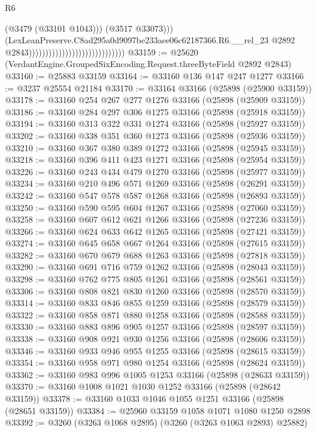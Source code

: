 \begin{lexlean}{R6}
\begin{coremodule}
                                                                  (@3479 (@33101 @1043)))
                                                                (@3517 @33073)))
                                                            (LexLeanPreserve.C8ad295a0d9097be233aee06c62187366.R6.__rel_23
                                                              @2892
                                                              @2843)))))))))))))))))))))))))))))
@33159 := @25620 (VerdantEngine.GroupedSixEncoding.Request.threeByteField @2892 @2843)
@33160 := @25883 @33159
@33164 := @33160 @136 @147 @247 @1277
@33166 := @3237 @25554 @21184
@33170 := @33164 @33166 (@25898 (@25900 @33159))
@33178 := @33160 @254 @267 @277 @1276 @33166 (@25898 (@25909 @33159))
@33186 := @33160 @284 @297 @306 @1275 @33166 (@25898 (@25918 @33159))
@33194 := @33160 @313 @322 @331 @1274 @33166 (@25898 (@25927 @33159))
@33202 := @33160 @338 @351 @360 @1273 @33166 (@25898 (@25936 @33159))
@33210 := @33160 @367 @380 @389 @1272 @33166 (@25898 (@25945 @33159))
@33218 := @33160 @396 @411 @423 @1271 @33166 (@25898 (@25954 @33159))
@33226 := @33160 @243 @434 @479 @1270 @33166 (@25898 (@25977 @33159))
@33234 := @33160 @210 @496 @571 @1269 @33166 (@25898 (@26291 @33159))
@33242 := @33160 @547 @578 @587 @1268 @33166 (@25898 (@26893 @33159))
@33250 := @33160 @590 @595 @604 @1267 @33166 (@25898 (@27060 @33159))
@33258 := @33160 @607 @612 @621 @1266 @33166 (@25898 (@27236 @33159))
@33266 := @33160 @624 @633 @642 @1265 @33166 (@25898 (@27421 @33159))
@33274 := @33160 @645 @658 @667 @1264 @33166 (@25898 (@27615 @33159))
@33282 := @33160 @670 @679 @688 @1263 @33166 (@25898 (@27818 @33159))
@33290 := @33160 @691 @716 @759 @1262 @33166 (@25898 (@28043 @33159))
@33298 := @33160 @762 @775 @805 @1261 @33166 (@25898 (@28561 @33159))
@33306 := @33160 @808 @821 @830 @1260 @33166 (@25898 (@28570 @33159))
@33314 := @33160 @833 @846 @855 @1259 @33166 (@25898 (@28579 @33159))
@33322 := @33160 @858 @871 @880 @1258 @33166 (@25898 (@28588 @33159))
@33330 := @33160 @883 @896 @905 @1257 @33166 (@25898 (@28597 @33159))
@33338 := @33160 @908 @921 @930 @1256 @33166 (@25898 (@28606 @33159))
@33346 := @33160 @933 @946 @955 @1255 @33166 (@25898 (@28615 @33159))
@33354 := @33160 @958 @971 @980 @1254 @33166 (@25898 (@28624 @33159))
@33362 := @33160 @983 @996 @1005 @1253 @33166 (@25898 (@28633 @33159))
@33370 := @33160 @1008 @1021 @1030 @1252 @33166 (@25898 (@28642 @33159))
@33378 := @33160 @1033 @1046 @1055 @1251 @33166 (@25898 (@28651 @33159))
@33384 := @25960 @33159 @1058 @1071 @1080 @1250 @2898
@33392 := @3260 (@3263 @1068 @2895) (@3260 (@3263 @1063 @2893) @25882)

\end{coremodule}
\end{lexlean}
